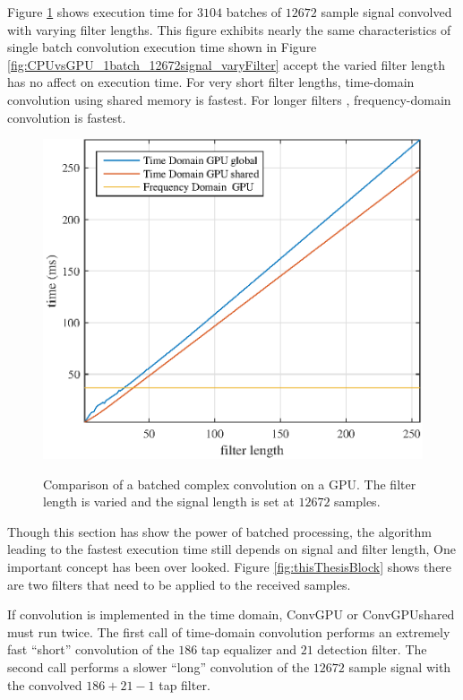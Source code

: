 Figure \ref{fig:CPUvsGPU_3104batch_12672signal_varyFilter} shows execution time for $3104$ batches of $12672$ sample signal convolved with varying filter lengths.
This figure exhibits nearly the same characteristics of single batch convolution execution time shown in Figure \ref{fig:CPUvsGPU_1batch_12672signal_varyFilter} accept the varied filter length has no affect on execution time.
For very short filter lengths, time-domain convolution using shared memory is fastest.
For longer filters , frequency-domain convolution is fastest.
\begin{figure}
	\centering\includegraphics[width=5in]{figures/gpu_intro/CPUvsGPU_3104batch_12672signal_varyFilter.eps}
	\label{fig:CPUvsGPU_3104batch_12672signal_varyFilter}
	\caption{Comparison of a batched complex convolution on a GPU. The filter length is varied and the signal length is set at $12672$ samples.}
\end{figure}

Though this section has show the power of batched processing, the algorithm leading to the fastest execution time still depends on signal and filter length,
One important concept has been over looked.
Figure \ref{fig:thisThesisBlock} shows there are two filters that need to be applied to the received samples. 

If convolution is implemented in the time domain, ConvGPU or ConvGPUshared must run twice.
The first call of time-domain convolution performs an extremely fast ``short'' convolution of the $186$ tap equalizer and $21$ detection filter.
The second call performs a slower ``long'' convolution of the $12672$ sample signal with the  convolved $186+21-1$ tap filter.

